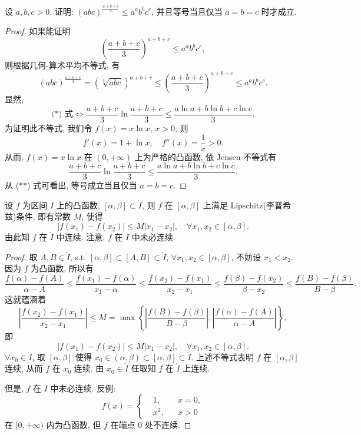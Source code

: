 \begin{example}\label{ex:3.6.4}
设 $a,b,c>0$. 证明: $(abc)^{\frac{a+b+c}{3}}\leqslant a^{a}b^{b}c^{c}$, 并且等号当且仅当 $a=b=c$ 时才成立.
\end{example}

\begin{proof}
如果能证明
\begin{equation}
\left(\frac{a+b+c}{3}\right)^{a+b+c}\leqslant a^{a}b^{b}c^{c}, \tag{*}
\end{equation}
则根据几何-算术平均不等式, 有
\begin{equation}
(abc)^{\frac{a+b+c}{3}}=(\sqrt[3]{abc})^{a+b+c}\leqslant\left(\frac{a+b+c}{3}\right)^{a+b+c}\leqslant a^{a}b^{b}c^{c}. \tag{**}
\end{equation}
显然,
\[
\text{(*) 式}\Longleftrightarrow \frac{a+b+c}{3}\ln\frac{a+b+c}{3}\leqslant\frac{a\ln a+b\ln b+c\ln c}{3}.
\]
为证明此不等式, 我们令 $f(x)=x\ln x$, $x>0$, 则
\[
f'(x)=1+\ln x,\quad f''(x)=\frac{1}{x}>0.
\]
从而, $f(x)=x\ln x$ 在 $(0,+\infty)$ 上为严格的凸函数, 依 Jensen 不等式有
\[
\frac{a+b+c}{3}\ln\frac{a+b+c}{3}\leqslant\frac{a\ln a+b\ln b+c\ln c}{3}.
\]
从 (**) 式可看出, 等号成立当且仅当 $a=b=c$.
\end{proof}

\begin{example}\label{ex:3.6.5}
设 $f$ 为区间 $I$ 上的凸函数, $[\alpha,\beta]\subset\mathring{I}$, 则 $f$ 在 $[\alpha,\beta]$ 上满足 Lipschitz(李普希兹)条件, 即有常数 $M$, 使得
\[
|f(x_{1})-f(x_{2})|\leqslant M|x_{1}-x_{2}|,\quad\forall x_{1},x_{2}\in[\alpha,\beta].
\]
由此知 $f$ 在 $\mathring{I}$ 中连续. 注意, $f$ 在 $I$ 中未必连续.
\end{example}

\begin{proof}
取 $A,B\in\mathring{I}$, s.t. $[\alpha,\beta]\subset[A,B]\subset\mathring{I}$, $\forall x_{1},x_{2}\in[\alpha,\beta]$, 不妨设 $x_{1}<x_{2}$. 因为 $f$ 为凸函数, 所以有
\[
\frac{f(\alpha)-f(A)}{\alpha-A}\leqslant\frac{f(x_{1})-f(\alpha)}{x_{1}-\alpha}\leqslant\frac{f(x_{2})-f(x_{1})}{x_{2}-x_{1}}\leqslant\frac{f(\beta)-f(x_{2})}{\beta-x_{2}}\leqslant\frac{f(B)-f(\beta)}{B-\beta}.
\]
这就蕴涵着
\[
\left|\frac{f(x_{2})-f(x_{1})}{x_{2}-x_{1}}\right|\leqslant M=\max\left\{\left|\frac{f(B)-f(\beta)}{B-\beta}\right|,\left|\frac{f(\alpha)-f(A)}{\alpha-A}\right|\right\},
\]
即
\[
|f(x_{1})-f(x_{2})|\leqslant M|x_{1}-x_{2}|,\quad\forall x_{1},x_{2}\in[\alpha,\beta].
\]
$\forall x_{0}\in\mathring{I}$, 取 $[\alpha,\beta]$ 使得 $x_{0}\in(\alpha,\beta)\subset[\alpha,\beta]\subset\mathring{I}$. 上述不等式表明 $f$ 在 $[\alpha,\beta]$ 连续, 从而 $f$ 在 $x_{0}$ 连续. 由 $x_{0}\in\mathring{I}$ 任取知 $f$ 在 $\mathring{I}$ 上连续.

但是, $f$ 在 $I$ 中未必连续. 反例:
\[
f(x)=\left\{
\begin{aligned}
&1, &&x=0,\\
&x^{2}, &&x>0
\end{aligned}\right.
\]
在 $[0,+\infty)$ 内为凸函数, 但 $f$ 在端点 $0$ 处不连续.
\end{proof}

